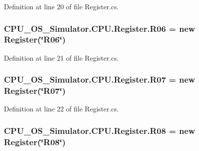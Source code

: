 Definition at line 20 of file Register.\+cs.

\hypertarget{class_c_p_u___o_s___simulator_1_1_c_p_u_1_1_register_a643141b987101b5bc93f99d04faecca8}{}
\subsubsection[{R06}]{ C\+P\+U\+\_\+\+O\+S\+\_\+\+Simulator.\+C\+P\+U.\+Register.\+R06 = new {\bf Register}(\char`\"{}R06\char`\"{})\hspace{0.3cm}{\ttfamily [static]}}\label{class_c_p_u___o_s___simulator_1_1_c_p_u_1_1_register_a643141b987101b5bc93f99d04faecca8}


Definition at line 21 of file Register.\+cs.

\hypertarget{class_c_p_u___o_s___simulator_1_1_c_p_u_1_1_register_a2224ffa8d2250d999afcddf739b5762b}{}
\subsubsection[{R07}]{ C\+P\+U\+\_\+\+O\+S\+\_\+\+Simulator.\+C\+P\+U.\+Register.\+R07 = new {\bf Register}(\char`\"{}R07\char`\"{})\hspace{0.3cm}{\ttfamily [static]}}\label{class_c_p_u___o_s___simulator_1_1_c_p_u_1_1_register_a2224ffa8d2250d999afcddf739b5762b}


Definition at line 22 of file Register.\+cs.

\hypertarget{class_c_p_u___o_s___simulator_1_1_c_p_u_1_1_register_a782cd395e24947e6bb509cbf61d090e2}{}
\subsubsection[{R08}]{ C\+P\+U\+\_\+\+O\+S\+\_\+\+Simulator.\+C\+P\+U.\+Register.\+R08 = new {\bf Register}(\char`\"{}R08\char`\"{})\hspace{0.3cm}{\ttfamily [static]}}\label{class_c_p_u___o_s___simulator_1_1_c_p_u_1_1_register_a782cd395e24947e6bb509cbf61d090e2}


